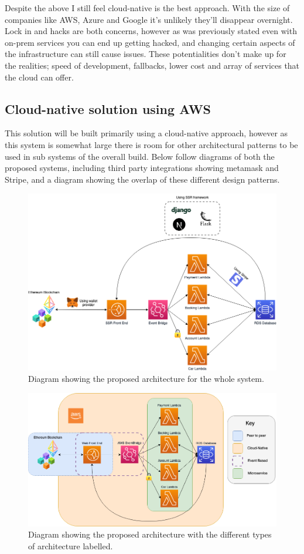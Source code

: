  Despite the above I still feel cloud-native is the best approach. With the size of companies like AWS, Azure and Google it's unlikely they'll disappear
  overnight. Lock in and hacks are both concerns, however as was previously stated even with on-prem services you can end up getting hacked, and changing
  certain aspects of the infrastructure can still cause issues. These potentialities don't make up for the realities; speed of development, fallbacks, 
  lower cost and array of services that the cloud can offer. 

  \subsection{Cloud-native solution using AWS}
  This solution will be built primarily using a cloud-native approach, however as this system is somewhat large there is room for other 
  architectural patterns to be used in sub systems of the overall build. Below follow diagrams of both the proposed systems, including third party 
  integrations showing metamask and Stripe, and a diagram showing the overlap of these different design patterns.

  \begin{figure}[H]
    \centering
    \includegraphics[width=12cm]{assets/architectureEvents.drawio.png}
    \caption{Diagram showing the proposed architecture for the whole system.}
    \label{fig:architecture}
  \end{figure}  

  \begin{figure}[H]
    \centering
    \includegraphics[width=12cm]{assets/architectureSectionedEvents.drawio.png}
    \caption{Diagram showing the proposed architecture with the different types of architecture labelled.}
    \label{fig:architectureSectioned}
  \end{figure}


